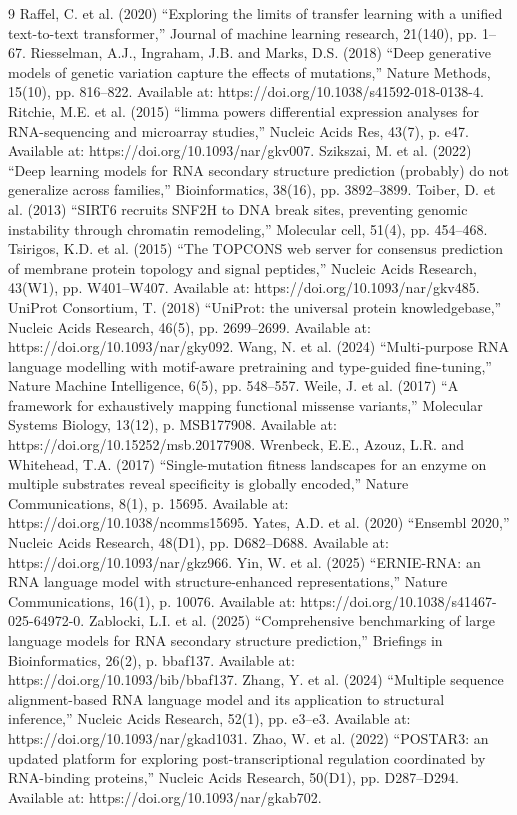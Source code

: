 \documentclass[11pt]{article}
\begin{document}
\begin{thebibliography}{9}
 Raffel, C. et al. (2020) “Exploring the limits of transfer learning with a unified text-to-text transformer,” Journal of machine learning research, 21(140), pp. 1–67. 
 Riesselman, A.J., Ingraham, J.B. and Marks, D.S. (2018) “Deep generative models of genetic variation capture the effects of mutations,” Nature Methods, 15(10), pp. 816–822. Available at: https://doi.org/10.1038/s41592-018-0138-4. 
 Ritchie, M.E. et al. (2015) “limma powers differential expression analyses for RNA-sequencing and microarray studies,” Nucleic Acids Res, 43(7), p. e47. Available at: https://doi.org/10.1093/nar/gkv007. 
 Szikszai, M. et al. (2022) “Deep learning models for RNA secondary structure prediction (probably) do not generalize across families,” Bioinformatics, 38(16), pp. 3892–3899. 
 Toiber, D. et al. (2013) “SIRT6 recruits SNF2H to DNA break sites, preventing genomic instability through chromatin remodeling,” Molecular cell, 51(4), pp. 454–468. 
 Tsirigos, K.D. et al. (2015) “The TOPCONS web server for consensus prediction of membrane protein topology and signal peptides,” Nucleic Acids Research, 43(W1), pp. W401–W407. Available at: https://doi.org/10.1093/nar/gkv485. 
 UniProt Consortium, T. (2018) “UniProt: the universal protein knowledgebase,” Nucleic Acids Research, 46(5), pp. 2699–2699. Available at: https://doi.org/10.1093/nar/gky092. 
 Wang, N. et al. (2024) “Multi-purpose RNA language modelling with motif-aware pretraining and type-guided fine-tuning,” Nature Machine Intelligence, 6(5), pp. 548–557. 
 Weile, J. et al. (2017) “A framework for exhaustively mapping functional missense variants,” Molecular Systems Biology, 13(12), p. MSB177908. Available at: https://doi.org/10.15252/msb.20177908. 
 Wrenbeck, E.E., Azouz, L.R. and Whitehead, T.A. (2017) “Single-mutation fitness landscapes for an enzyme on multiple substrates reveal specificity is globally encoded,” Nature Communications, 8(1), p. 15695. Available at: https://doi.org/10.1038/ncomms15695. 
 Yates, A.D. et al. (2020) “Ensembl 2020,” Nucleic Acids Research, 48(D1), pp. D682–D688. Available at: https://doi.org/10.1093/nar/gkz966. 
 Yin, W. et al. (2025) “ERNIE-RNA: an RNA language model with structure-enhanced representations,” Nature Communications, 16(1), p. 10076. Available at: https://doi.org/10.1038/s41467-025-64972-0. 
 Zablocki, L.I. et al. (2025) “Comprehensive benchmarking of large language models for RNA secondary structure prediction,” Briefings in Bioinformatics, 26(2), p. bbaf137. Available at: https://doi.org/10.1093/bib/bbaf137. 
 Zhang, Y. et al. (2024) “Multiple sequence alignment-based RNA language model and its application to structural inference,” Nucleic Acids Research, 52(1), pp. e3–e3. Available at: https://doi.org/10.1093/nar/gkad1031. 
 Zhao, W. et al. (2022) “POSTAR3: an updated platform for exploring post-transcriptional regulation coordinated by RNA-binding proteins,” Nucleic Acids Research, 50(D1), pp. D287–D294. Available at: https://doi.org/10.1093/nar/gkab702.

\end{thebibliography}
\end{document}
